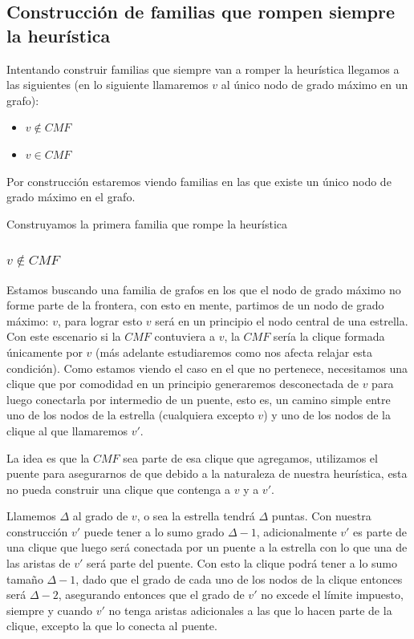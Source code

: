 \subsection{Construcci\'on de familias que rompen siempre la heur\'istica}

Intentando construir familias que siempre van a romper la heur\'istica llegamos a las siguientes
(en lo siguiente llamaremos $v$ al \'unico nodo de grado m\'aximo en un grafo):
\begin{itemize}
	\item{$v \notin CMF$}
	\item{$v \in CMF$}
\end{itemize}

Por construcci\'on estaremos viendo familias en las que existe un \'unico nodo de grado m\'aximo en el grafo.

Construyamos la primera familia que rompe la heur\'istica

\subsubsection{$v \notin CMF$}

Estamos buscando una familia de grafos en los que el nodo de grado m\'aximo no forme parte de la 
frontera, con esto en mente, partimos de un nodo de grado m\'aximo: $v$, para lograr esto $v$ ser\'a
en un principio el nodo central de una estrella. Con este escenario si la $CMF$ contuviera a $v$, la
$CMF$ ser\'ia la clique formada \'unicamente por $v$ (m\'as adelante estudiaremos como nos afecta 
relajar esta condici\'on). Como estamos viendo el caso en el que no pertenece, necesitamos una clique 
que por comodidad en un principio generaremos desconectada de $v$ para luego conectarla por 
intermedio de un puente, esto es, un camino simple entre uno de los nodos de la estrella (cualquiera
excepto $v$) y uno de los nodos de la clique al que llamaremos $v'$. 

La idea es que la $CMF$ sea parte de esa clique que agregamos, utilizamos el puente para asegurarnos
de que debido a la naturaleza de nuestra heur\'istica, esta no pueda construir una clique que contenga
a $v$ y a $v'$.

Llamemos $\Delta$ al grado de $v$, o sea la estrella tendr\'a $\Delta$ puntas. Con nuestra construcci\'on 
$v'$ puede tener a lo sumo grado $\Delta -1$, adicionalmente $v'$ es parte de una clique que luego ser\'a 
conectada por un puente a la estrella con lo que una de las aristas de $v'$ ser\'a parte del puente. 
Con esto la clique podr\'a tener a lo sumo tama\~no $\Delta -1$, dado que el grado de cada uno de los 
nodos de la clique entonces ser\'a $\Delta -2$, asegurando entonces que el grado de $v'$ no excede
el l\'imite impuesto, siempre y cuando $v'$ no tenga aristas adicionales a las que lo hacen 
parte de la clique, excepto la que lo conecta al puente.

